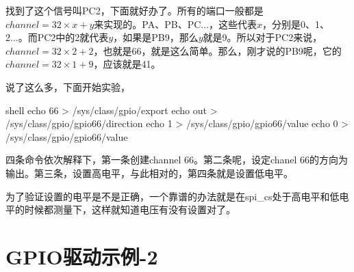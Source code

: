 \documentclass[lang=cn,newtx,10pt,scheme=chinese]{elegantbook}
\begin{document}
找到了这个信号叫PC2，下面就好办了。所有的端口一般都是$channel = 32 \times x+y$来实现的。PA、PB、PC...，这些代表$x$，分别是0、1、2...。而PC2中的2就代表$y$，如果是PB9，那么$y$就是9。所以对于PC2来说，$channel = 32 \times 2+ 2$，也就是66，就是这么简单。那么，刚才说的PB9呢，它的$channel = 32 \times 1 + 9$，应该就是41。

说了这么多，下面开始实验，

\begin{mycode}{shell}
echo 66 > /sys/class/gpio/export
echo out > /sys/class/gpio/gpio66/direction
echo 1 > /sys/class/gpio/gpio66/value
echo 0 > /sys/class/gpio/gpio66/value
\end{mycode}

四条命令依次解释下，第一条创建channel 66。第二条呢，设定chanel 66的方向为输出。第三条，设置高电平，与此相对的，第四条就是设置低电平。

为了验证设置的电平是不是正确，一个靠谱的办法就是在spi\_cs处于高电平和低电平的时候都测量下，这样就知道电压有没有设置对了。

\chapter{GPIO驱动示例-2}
\end{document}
